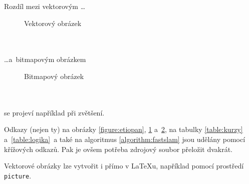\documentclass[a4paper, 11pt]{article}
\begin{document}
	Rozdíl mezi vektorovým \dots
	\begin{figure}[h]
		\centering
		\caption{Vektorový obrázek}
		\label{figure:vektorovy}
	\end{figure} \\ \\
	\dots a~bitmapovým obrázkem
	\begin{figure}[h]
		\centering
		\caption{Bitmapový obrázek}
		\label{figure:rastrovy}
	\end{figure} \\ \\
	se projeví například při zvětšení.

	Odkazy (nejen ty) na obrázky \ref{figure:etiopan}, \ref{figure:vektorovy} a~\ref{figure:rastrovy}, na
	tabulky \ref{table:kurzy} a~\ref{table:logika}~a také na algoritmus \ref{algorithm:fastslam} jsou
	udělány pomocí křížových odkazů. Pak je ovšem potřeba zdrojový soubor přeložit dvakrát.

	Vektorové obrázky lze vytvořit i přímo v {\LaTeX}u, například pomocí prostředí\texttt{ picture}.
\end{document}
